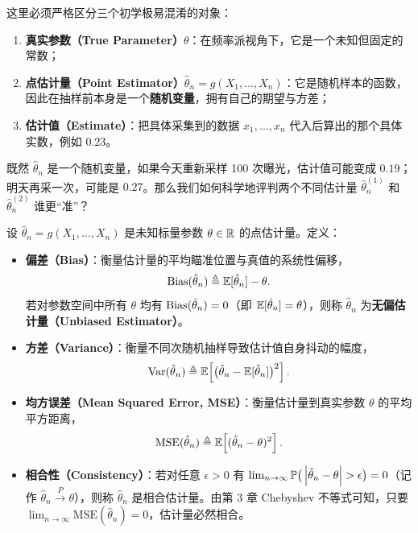 这里必须严格区分三个初学极易混淆的对象：
\begin{enumerate}
  \item \textbf{真实参数（True Parameter）$\theta$}：在频率派视角下，它是一个未知但固定的常数；
  \item \textbf{点估计量（Point Estimator）$\hat{\theta}_n = g(X_1, \dots, X_n)$}：它是随机样本的函数，因此在抽样前本身是一个\textbf{随机变量}，拥有自己的期望与方差；
  \item \textbf{估计值（Estimate）}：把具体采集到的数据 $x_1, \dots, x_n$ 代入后算出的那个具体实数，例如 $0.23$。
\end{enumerate}

既然 $\hat{\theta}_n$ 是一个随机变量，如果今天重新采样 100 次曝光，估计值可能变成 $0.19$；明天再采一次，可能是 $0.27$。那么我们如何科学地评判两个不同估计量 $\hat{\theta}_n^{(1)}$ 和 $\hat{\theta}_n^{(2)}$ 谁更“准”？

\begin{defBox}
\begin{definition}[偏差、方差、均方误差与相合性]
\label{def:ch5-estimator-metrics}
设 $\hat{\theta}_n = g(X_1, \dots, X_n)$ 是未知标量参数 $\theta \in \mathbb{R}$ 的点估计量。定义：
\begin{itemize}
  \item \textbf{偏差（Bias）}：衡量估计量的平均瞄准位置与真值的系统性偏移，
  \[
    \operatorname{Bias}(\hat{\theta}_n) \triangleq \mathbb{E}[\hat{\theta}_n] - \theta.
  \]
  若对参数空间中所有 $\theta$ 均有 $\operatorname{Bias}(\hat{\theta}_n) = 0$（即 $\mathbb{E}[\hat{\theta}_n] = \theta$），则称 $\hat{\theta}_n$ 为\textbf{无偏估计量（Unbiased Estimator）}。
  \item \textbf{方差（Variance）}：衡量不同次随机抽样导致估计值自身抖动的幅度，
  \[
    \operatorname{Var}(\hat{\theta}_n) \triangleq \mathbb{E}\!\left[\big(\hat{\theta}_n - \mathbb{E}[\hat{\theta}_n]\big)^2\right].
  \]
  \item \textbf{均方误差（Mean Squared Error, MSE）}：衡量估计量到真实参数 $\theta$ 的平均平方距离，
  \[
    \mathrm{MSE}(\hat{\theta}_n) \triangleq \mathbb{E}\!\left[(\hat{\theta}_n - \theta)^2\right].
  \]
  \item \textbf{相合性（Consistency）}：若对任意 $\epsilon > 0$ 有 $\lim_{n\to\infty}\mathbb{P}\big(\left|\hat{\theta}_n - \theta\right| > \epsilon\big) = 0$（记作 $\hat{\theta}_n \xrightarrow{P} \theta$），则称 $\hat{\theta}_n$ 是相合估计量。由第 3 章 Chebyshev 不等式可知，只要 $\lim_{n\to\infty}\mathrm{MSE}(\hat{\theta}_n) = 0$，估计量必然相合。
\end{itemize}
\end{definition}
\end{defBox}

